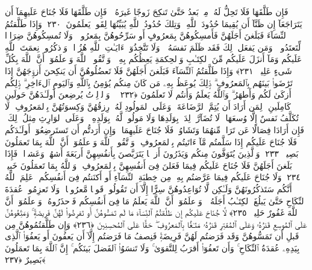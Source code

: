  فَإِن طَلَّقَهَا فَلَا تَحِلُّ لَهُۥ مِنۢ بَعدُ حَتَّىٰ تَنكِحَ زَوجًا غَيرَهُۥ ۗ فَإِن طَلَّقَهَا فَلَا جُنَاحَ عَلَيهِمَآ أَن يَتَرَاجَعَآ إِن ظَنَّآ أَن يُقِيمَا حُدُودَ ٱللَّهِ ۗ وَتِلكَ حُدُودُ ٱللَّهِ يُبَيِّنُهَا لِقَومٍۢ يَعلَمُونَ ﴿٢٣٠﴾
 وَإِذَا طَلَّقتُمُ ٱلنِّسَآءَ فَبَلَغنَ أَجَلَهُنَّ فَأَمسِكُوهُنَّ بِمَعرُوفٍ أَو سَرِّحُوهُنَّ بِمَعرُوفٍۢ ۚ وَلَا تُمسِكُوهُنَّ ضِرَارًۭا لِّتَعتَدُوا۟ ۚ وَمَن يَفعَل ذَٟلِكَ فَقَد ظَلَمَ نَفسَهُۥ ۚ وَلَا تَتَّخِذُوٓا۟ ءَايَـٰتِ ٱللَّهِ هُزُوًۭا ۚ وَٱذكُرُوا۟ نِعمَتَ ٱللَّهِ عَلَيكُم وَمَآ أَنزَلَ عَلَيكُم مِّنَ ٱلكِتَـٰبِ وَٱلحِكمَةِ يَعِظُكُم بِهِۦ ۚ وَٱتَّقُوا۟ ٱللَّهَ وَٱعلَمُوٓا۟ أَنَّ ٱللَّهَ بِكُلِّ شَىءٍ عَلِيمٌۭ ﴿٢٣١﴾
 وَإِذَا طَلَّقتُمُ ٱلنِّسَآءَ فَبَلَغنَ أَجَلَهُنَّ فَلَا تَعضُلُوهُنَّ أَن يَنكِحنَ أَزوَٟجَهُنَّ إِذَا تَرَٰضَوا۟ بَينَهُم بِٱلمَعرُوفِ ۗ ذَٟلِكَ يُوعَظُ بِهِۦ مَن كَانَ مِنكُم يُؤمِنُ بِٱللَّهِ وَٱليَومِ ٱلءَاخِرِ ۗ ذَٟلِكُم أَزكَىٰ لَكُم وَأَطهَرُ ۗ وَٱللَّهُ يَعلَمُ وَأَنتُم لَا تَعلَمُونَ ﴿٢٣٢﴾
 ۞ وَٱلوَٟلِدَٟتُ يُرضِعنَ أَولَـٰدَهُنَّ حَولَينِ كَامِلَينِ ۖ لِمَن أَرَادَ أَن يُتِمَّ ٱلرَّضَاعَةَ ۚ وَعَلَى ٱلمَولُودِ لَهُۥ رِزقُهُنَّ وَكِسوَتُهُنَّ بِٱلمَعرُوفِ ۚ لَا تُكَلَّفُ نَفسٌ إِلَّا وُسعَهَا ۚ لَا تُضَآرَّ وَٟلِدَةٌۢ بِوَلَدِهَا وَلَا مَولُودٌۭ لَّهُۥ بِوَلَدِهِۦ ۚ وَعَلَى ٱلوَارِثِ مِثلُ ذَٟلِكَ ۗ فَإِن أَرَادَا فِصَالًا عَن تَرَاضٍۢ مِّنهُمَا وَتَشَاوُرٍۢ فَلَا جُنَاحَ عَلَيهِمَا ۗ وَإِن أَرَدتُّم أَن تَستَرضِعُوٓا۟ أَولَـٰدَكُم فَلَا جُنَاحَ عَلَيكُم إِذَا سَلَّمتُم مَّآ ءَاتَيتُم بِٱلمَعرُوفِ ۗ وَٱتَّقُوا۟ ٱللَّهَ وَٱعلَمُوٓا۟ أَنَّ ٱللَّهَ بِمَا تَعمَلُونَ بَصِيرٌۭ ﴿٢٣٣﴾
 وَٱلَّذِينَ يُتَوَفَّونَ مِنكُم وَيَذَرُونَ أَزوَٟجًۭا يَتَرَبَّصنَ بِأَنفُسِهِنَّ أَربَعَةَ أَشهُرٍۢ وَعَشرًۭا ۖ فَإِذَا بَلَغنَ أَجَلَهُنَّ فَلَا جُنَاحَ عَلَيكُم فِيمَا فَعَلنَ فِىٓ أَنفُسِهِنَّ بِٱلمَعرُوفِ ۗ وَٱللَّهُ بِمَا تَعمَلُونَ خَبِيرٌۭ ﴿٢٣٤﴾
 وَلَا جُنَاحَ عَلَيكُم فِيمَا عَرَّضتُم بِهِۦ مِن خِطبَةِ ٱلنِّسَآءِ أَو أَكنَنتُم فِىٓ أَنفُسِكُم ۚ عَلِمَ ٱللَّهُ أَنَّكُم سَتَذكُرُونَهُنَّ وَلَـٰكِن لَّا تُوَاعِدُوهُنَّ سِرًّا إِلَّآ أَن تَقُولُوا۟ قَولًۭا مَّعرُوفًۭا ۚ وَلَا تَعزِمُوا۟ عُقدَةَ ٱلنِّكَاحِ حَتَّىٰ يَبلُغَ ٱلكِتَـٰبُ أَجَلَهُۥ ۚ وَٱعلَمُوٓا۟ أَنَّ ٱللَّهَ يَعلَمُ مَا فِىٓ أَنفُسِكُم فَٱحذَرُوهُ ۚ وَٱعلَمُوٓا۟ أَنَّ ٱللَّهَ غَفُورٌ حَلِيمٌۭ ﴿٢٣٥﴾
 لَّا جُنَاحَ عَلَيكُم إِن طَلَّقتُمُ ٱلنِّسَآءَ مَا لَم تَمَسُّوهُنَّ أَو تَفرِضُوا۟ لَهُنَّ فَرِيضَةًۭ ۚ وَمَتِّعُوهُنَّ عَلَى ٱلمُوسِعِ قَدَرُهُۥ وَعَلَى ٱلمُقتِرِ قَدَرُهُۥ مَتَـٰعًۢا بِٱلمَعرُوفِ ۖ حَقًّا عَلَى ٱلمُحسِنِينَ ﴿٢٣٦﴾
 وَإِن طَلَّقتُمُوهُنَّ مِن قَبلِ أَن تَمَسُّوهُنَّ وَقَد فَرَضتُم لَهُنَّ فَرِيضَةًۭ فَنِصفُ مَا فَرَضتُم إِلَّآ أَن يَعفُونَ أَو يَعفُوَا۟ ٱلَّذِى بِيَدِهِۦ عُقدَةُ ٱلنِّكَاحِ ۚ وَأَن تَعفُوٓا۟ أَقرَبُ لِلتَّقوَىٰ ۚ وَلَا تَنسَوُا۟ ٱلفَضلَ بَينَكُم ۚ إِنَّ ٱللَّهَ بِمَا تَعمَلُونَ بَصِيرٌ ﴿٢٣٧﴾
